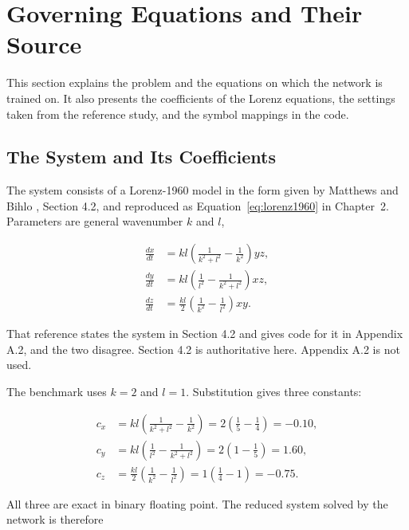 \section{Governing Equations and Their Source}
\label{sec:impl_equations}

This section explains the problem and the equations on which the network is trained on. It also presents the coefficients of the Lorenz equations, the settings taken from the reference study, and the symbol mappings in the code. 


\subsection{The System and Its Coefficients}

The system consists of a Lorenz-1960 model in the form given by Matthews and Bihlo \cite{matthews2024pinnde}, Section 4.2, and reproduced as Equation~\ref{eq:lorenz1960} in Chapter~2. Parameters are general wavenumber $k$ and $l$,

\begin{equation}
\begin{aligned}
\frac{dx}{dt} &= kl\left(\frac{1}{k^2 + l^2} - \frac{1}{k^2}\right) yz, \\
\frac{dy}{dt} &= kl\left(\frac{1}{l^2} - \frac{1}{k^2 + l^2}\right) xz, \\
\frac{dz}{dt} &= \frac{kl}{2}\left(\frac{1}{k^2} - \frac{1}{l^2}\right) xy.
\end{aligned}
\label{eq:impl_lorenz_general}
\end{equation}

That reference states the system in Section 4.2 and gives code for it in Appendix A.2, and the two disagree. Section 4.2 is authoritative here. Appendix A.2 is not used.

The benchmark uses $k = 2$ and $l = 1$. Substitution gives three constants:

\begin{align}
c_x &= kl\left(\frac{1}{k^2 + l^2} - \frac{1}{k^2}\right) = 2\left(\frac{1}{5} - \frac{1}{4}\right) = -0.10, \label{eq:coeff_x}\\
c_y &= kl\left(\frac{1}{l^2} - \frac{1}{k^2 + l^2}\right) = 2\left(1 - \frac{1}{5}\right) = 1.60, \label{eq:coeff_y}\\
c_z &= \frac{kl}{2}\left(\frac{1}{k^2} - \frac{1}{l^2}\right) = 1\left(\frac{1}{4} - 1\right) = -0.75. \label{eq:coeff_z}
\end{align}

All three are exact in binary floating point. The reduced system solved by the network is therefore

